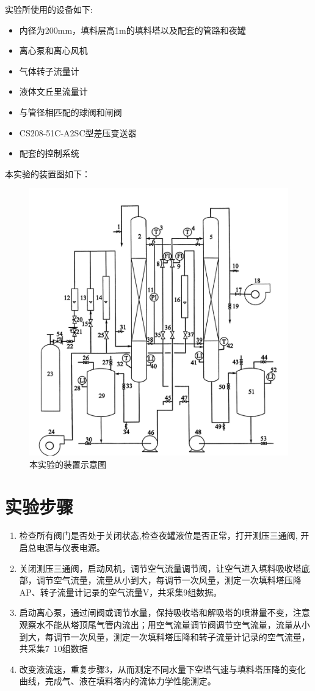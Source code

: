 \documentclass[a4paper,UTF8]{ctexrep}
\theoremstyle{plain}
\theoremstyle{definition}
\numberwithin{equation}{chapter}
\begin{document}
	 实验所使用的设备如下:
    
    
\begin{itemize}
    \item 内径为200mm，填料层高1m的填料塔以及配套的管路和夜罐
    \item 离心泵和离心风机
    \item 气体转子流量计
    \item 液体文丘里流量计
    \item 与管径相匹配的球阀和闸阀
    \item CS208-51C-A2SC型差压变送器
    \item 配套的控制系统
\end{itemize}
\newpage

本实验的装置图如下：


\begin{figure}[h]
    \centering
    \includegraphics[width=0.7\linewidth]{吸收.pdf}
    \caption{本实验的装置示意图}
    \label{fig:enter-labesl}
\end{figure}

   

        \section{实验步骤}

        \begin{enumerate}
            \item 检查所有阀门是否处于关闭状态,检查夜罐液位是否正常，打开测压三通阀, 开启总电源与仪表电源。
            \item 关闭测压三通阀，启动风机，调节空⽓流量调节阀，让空⽓进⼊填料吸收塔底部，调节空⽓流量，流量从⼩到⼤，每调节⼀次风量，测定⼀次填料塔压降AP、转⼦流量计记录的空⽓流量V，共采集9组数据。
            \item 启动离心泵，通过闸阀或调节⽔量，保持吸收塔和解吸塔的喷淋量不变，注意观察⽔不能从塔顶尾⽓管内流出；⽤空⽓流量调节阀调节空⽓流量，流量从⼩到⼤，每调节⼀次风量，测定⼀次填料塔压降和转⼦流量计记录的空⽓流量，共采集7~10组数据
            \item 改变液流速，重复步骤3，从而测定不同⽔量下空塔⽓速与填料塔压降的变化曲线，完成⽓、液在填料塔内的流体⼒学性能测定。
        \end{enumerate}
\newpage
\end{document}
